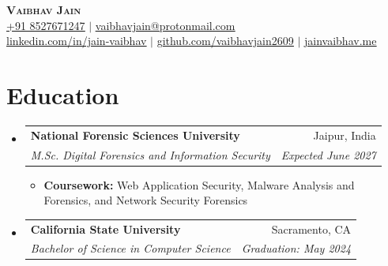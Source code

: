 \documentclass[letterpaper,10pt]{article}
\makeatletter
\newcommand{\resumeItem}[1]{
  \item\small{
    {#1 \vspace{-3pt}}
  }
}
\newcommand{\resumeSubheading}[4]{
  \vspace{-3pt}\item
    \begin{tabular*}{0.97\textwidth}[t]{l@{\extracolsep{\fill}}r}
      \textbf{#1} & #2 \\
      \textit{\small#3} & \textit{\small #4} \\
    \end{tabular*}\vspace{-8pt}
}
\newcommand{\resumeSubHeadingListStart}{\begin{itemize}[leftmargin=0.15in, label={}]}
\newcommand{\resumeSubHeadingListEnd}{\end{itemize}}
\newcommand{\resumeItemListStart}{\begin{itemize}}
\newcommand{\resumeItemListEnd}{\end{itemize}\vspace{-6pt}}
\makeatother
\begin{document}

\begin{center}
    \textbf{\Huge \scshape Vaibhav Jain} \\ \vspace{1pt}
    \small \href{tel:+918527671247}{\underline{+91 8527671247}} $|$
    \href{mailto:vaibhavjain@protonmail.com}{\underline{vaibhavjain@protonmail.com}} \\ \vspace{1pt}
    \small \href{https://linkedin.com/in/jain-vaibhav}{\underline{linkedin.com/in/jain-vaibhav}} $|$
    \href{https://github.com/vaibhavjain2609}{\underline{github.com/vaibhavjain2609}} $|$
    \href{https://jainvaibhav.me/}{\underline{jainvaibhav.me}} \\
\end{center}

\section{Education}
  \resumeSubHeadingListStart
  \resumeSubheading{National Forensic Sciences University}{Jaipur, India}{M.Sc. Digital Forensics and Information Security}
  {Expected June 2027}
   \resumeItemListStart
        \resumeItem{\textbf{Coursework:} Web Application Security, Malware Analysis and Forensics, and Network Security Forensics}
    \resumeItemListEnd
    \resumeSubheading
      {California State University}{Sacramento, CA}
      {Bachelor of Science in Computer Science}{Graduation: May 2024}
  \resumeSubHeadingListEnd
\end{document}
